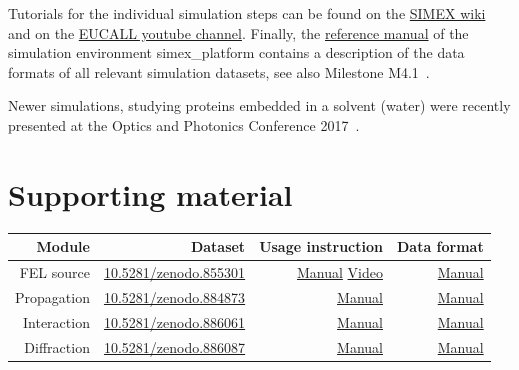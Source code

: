 \documentclass[12pt]{scrartcl}
\begin{document}
Tutorials for the individual simulation steps can be found on the
\href{https://www.github.com/eucall-software/simex_platform/wiki/SimEx-Tutorial}{SIMEX wiki} and
on the
\href{https://www.youtube.com/channel/UC5H8cATZiUPNfF7P_xEhBpQ/videos}{EUCALL youtube channel}.
Finally, the \href{https://eucall-software.github.io/simex_platform/}{reference manual} of the simulation environment simex\_platform
contains a description of the data formats of all relevant simulation datasets, see also
Milestone M4.1~\cite{EUCALL_SIMEX_M4.1}.

Newer simulations, studying proteins embedded in
a solvent (water) were recently presented at the Optics and Photonics Conference
2017~\cite{Fortmann-Grote2017b}.

\section{Supporting material}
\begin{tabular}[ht]{|r|r|r|r|}
  \hline
  \textbf{Module}       & \textbf{Dataset}  &
  \textbf{Usage instruction}   & \textbf{Data format}       \\
  \hline
    FEL source &
    \href{https://dx.doi.org/10.5281/zenodo.855301}{10.5281/zenodo.855301} &
    \href{https://github.com/eucall-software/simex_platform/wiki/SimEx-Tutorial#prepating-the-source-input}{Manual}
    \href{https://youtu.be/Ql1p5-CLHug}{Video} &
    \href{https://eucall-software.github.io/simex_platform/#fel-source-calculations-fast}{Manual}
  \\
    Propagation &
    \href{https://dx.doi.org/10.5281/zenodo.884873}{10.5281/zenodo.884873} &
    \href{https://github.com/eucall-software/simex_platform/wiki/SimEx-Tutorial#beamline-propagation}{Manual} &
    \href{https://eucall-software.github.io/simex_platform/#coherent-wavefront-propagation-wpg-srw}{Manual}
  \\
    Interaction &
    \href{https://dx.doi.org/10.5281/zenodo.886061}{10.5281/zenodo.886061} &
    \href{https://github.com/eucall-software/simex_platform/wiki/SimEx-Tutorial#photon-matter-interaction}{Manual} &
    \href{https://eucall-software.github.io/simex_platform/#photon-matter-interaction-xmdyn}{Manual}
  \\
    Diffraction &
    \href{https://dx.doi.org/10.5281/zenodo.886087}{10.5281/zenodo.886087} &
    \href{https://github.com/eucall-software/simex_platform/wiki/SimEx-Tutorial#diffraction}{Manual} &
    \href{https://eucall-software.github.io/simex_platform/#diffraction-singfel}{Manual}
  \\
  \hline
\end{tabular}
%

\printbibliography[notkeyword=zenodo,notkeyword=eucall, notkeyword=simex, notkeyword=tutorial, title={Articles}]
\printbibliography[notkeyword=zenodo,notkeyword=tutorial, keyword=simex, keyword=eucall, title={EUCALL Reports}]
\printbibliography[keyword=zenodo,notkeyword=tutorial, title={Datasets}]
%
%
\end{document}

